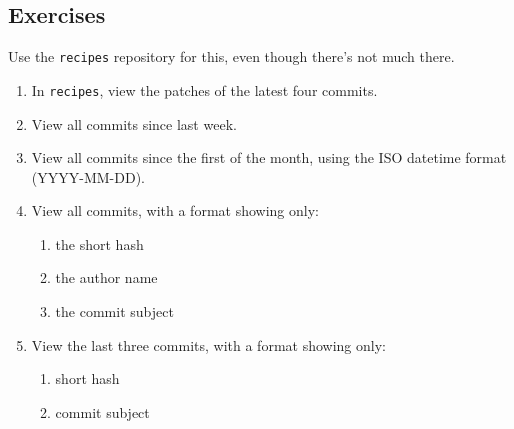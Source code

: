 \subsection{Exercises}
Use the \verb+recipes+ repository for this, even though there's not much
there.
\begin{enumerate}
    \item In \verb+recipes+, view the patches of the latest four commits.
    \item View all commits since last week.
    \item View all commits since the first of the month, using the ISO
        datetime format (YYYY-MM-DD).
    \item View all commits, with a format showing only:
        \begin{enumerate}
            \item the short hash
            \item the author name
            \item the commit subject
        \end{enumerate}
    \item View the last three commits, with a format showing only:
        \begin{enumerate}
            \item short hash
            \item commit subject
        \end{enumerate}
\end{enumerate}
